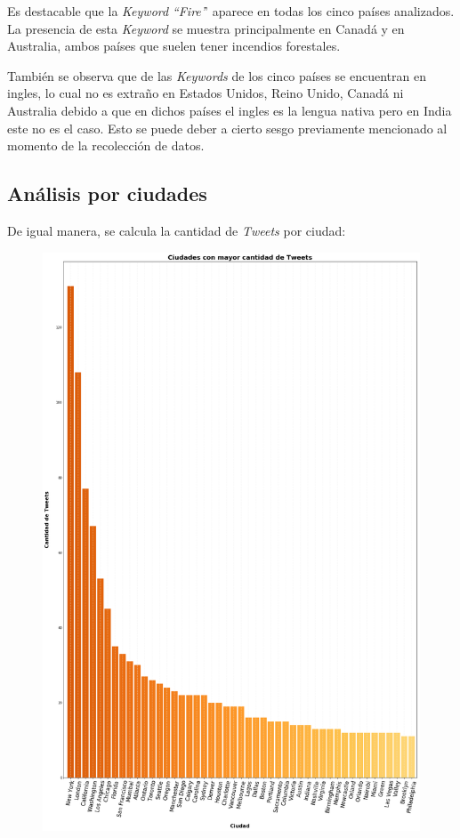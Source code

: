 \documentclass[titlepage,a4paper]{article}
\begin{document}
    
    Es destacable que la \textit{Keyword} \textit{``Fire'}' aparece en todas los cinco países analizados. La presencia de esta \textit{Keyword} se muestra principalmente en Canadá y en Australia, ambos países que suelen tener incendios forestales. 
    
    También se observa que de las \textit{Keywords} de los cinco países se encuentran en ingles, lo cual no es extraño en Estados Unidos, Reino Unido, Canadá ni Australia debido a que en dichos países el ingles es la lengua nativa pero en India este no es el caso. Esto se puede deber a cierto sesgo previamente mencionado al momento de la recolección de datos. 
    
    \subsection{Análisis por ciudades}
    
    De igual manera, se calcula la cantidad de \textit{Tweets} por ciudad:
    
    \begin{figure}[H]
    \centering
    \includegraphics[width=1\textwidth]{graficos/Analisis de Locacion/ciudades_con_mayor_cantidad_de_tweets.png}
    \caption{}
    \end{figure}
    
\end{document}

